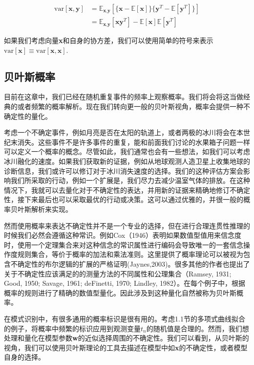 	\begin{equation}
	\begin{aligned}
	\mathrm{var}[\textbf{x}, \textbf{y}] & = \mathbb{E}_{\textbf{x},\textbf{y}}[\{\textbf{x} - \mathbb{E}[\textbf{x}]\}\{ \textbf{y}^T - \mathbb{E}[\textbf{y}^T] \}]\\
	& = \mathbb{E}_{\textbf{x},\textbf{y}}[\textbf{xy}^T] - \mathbb{E}[\textbf{x}] \mathbb{E}[\textbf{y}^T]
	\end{aligned}
	\end{equation}
	
	如果我们考虑向量\textbf{x}和自身的协方差，我们可以使用简单的符号来表示$\mathrm{var}[\textbf{x}] \equiv \mathrm{var}[\textbf{x},\textbf{x}]$.
	
{ \color{blue} \subsection{贝叶斯概率}}
	 目前在这章中，我们已经在随机重复事件的频率上观察概率。我们将会将这当做经典的或者频繁的概率解析。现在我们转向更一般的贝叶斯视角，概率会提供一种不确定性的量化。
	 
	 考虑一个不确定事件，例如月亮是否在太阳的轨道上，或者两极的冰川将会在本世纪末消失。这些事件不是许多事件的重复，能和前面我们讨论的水果箱子问题一样可以定义一个概率的概念。尽管如此，我们通常也会有一些想法，如我们可以考虑冰川融化的速度。如果我们获取新的证据，例如从地球观测人造卫星上收集地球的诊断信息，我们或许可以修订对于冰川消失速度的选择。我们的这种评估方案会影响我们所采取的行动，例如一个扩展是，我们尽力去减少温室气体的排放。在这种情况下，我就可以去量化对于不确定性的表达，并用新的证据来精确地修订不确定性，接下来最后也可以采取最优的行动或决策。这可以通过优雅的，并很一般的概率贝叶斯解析来实现。
	 
	 然而使用概率来表达不确定性并不是一个专业的选择，但在进行合理连贯性推理的时候我们必然会遵循这种常识。例如Cox（1946）表明如果数值型值用来信念度时，使用一个定理集合来对这种信念的常识属性进行编码会导致唯一的一套信念操作度规则集合，等价于概率的加法和乘法准则。这里提供了概率理论可以被视为包含不确定性的布尔逻辑的扩展的严格证明(Jaynes,2003)。很多其他的作者也提出了关于不确定性应该满足的的测量方法的不同属性和公理集合（Ramsey, 1931; Good, 1950; Savage, 1961; deFinetti, 1970; Lindley, 1982）。在每个例子中，根据概率的规则进行了精确的数值型量化。因此涉及到这种量化自然被称为贝叶斯概率。
	 
	 在模式识别中，有很多通用的概率标识是很有用的。考虑1.1节的多项式曲线拟合的例子，将概率中频繁的标识应用到观测变量$t_n$的随机值是合理的。然而，我们想处理和量化在模型参数\textbf{w}的近似选择周围的不确定性。我们可以看到，从贝叶斯的视角，我们可以使用贝叶斯理论的工具去描述在模型中如\textbf{x}的不确定性，或者模型自身的选择。
	 
